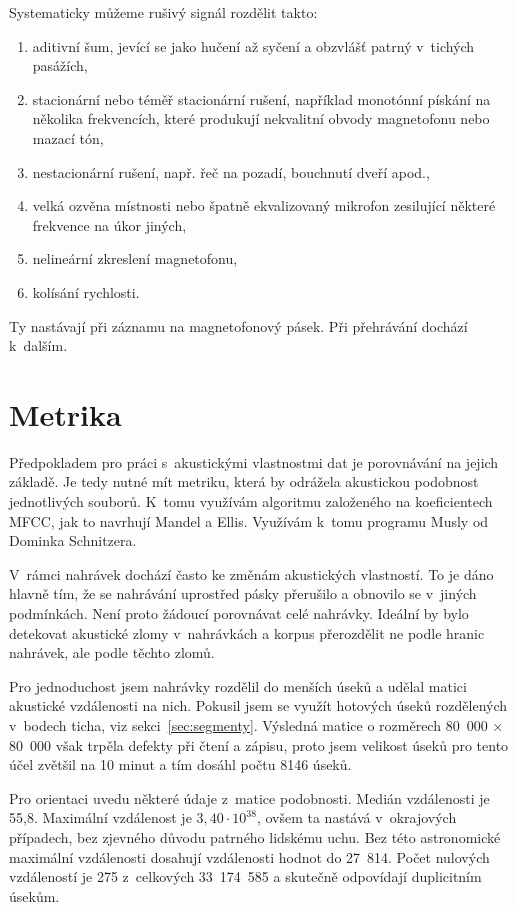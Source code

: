 Systematicky můžeme rušivý signál rozdělit takto:
\begin{enumerate}
\item{
    aditivní šum, jevící se jako hučení až syčení a obzvlášť patrný v~tichých
    pasážích,
}
\item{
    stacionární nebo téměř stacionární rušení, například monotónní pískání na
    několika frekvencích, které produkují nekvalitní obvody magnetofonu
    nebo mazací tón,
}
\item{
    nestacionární rušení, např. řeč na pozadí, bouchnutí dveří apod.,
}
\item{
    velká ozvěna místnosti nebo špatně ekvalizovaný mikrofon zesilující
    některé frekvence na úkor jiných,
}
\item{
    nelineární zkreslení magnetofonu,
}
\item{
    kolísání rychlosti.
}
\end{enumerate}
Ty nastávají při záznamu na magnetofonový pásek. Při přehrávání dochází
k~dalším.

\section{Metrika}
\label{sec:akustika:metrika}

Předpokladem pro práci s~akustickými vlastnostmi dat je porovnávání na jejich
základě. Je tedy nutné mít metriku, která by odrážela akustickou podobnost
jednotlivých souborů. K~tomu využívám algoritmu založeného na koeficientech
MFCC, jak to navrhují Mandel a Ellis\cite{mandel2005song}. Využívám
k~tomu programu Musly od Dominka Schnitzera\cite{schnitzer2011using}.

V~rámci nahrávek dochází často ke změnám akustických vlastností. To je dáno
hlavně tím, že se nahrávání uprostřed pásky přerušilo a obnovilo se v~jiných
podmínkách. Není proto žádoucí porovnávat celé nahrávky. Ideální by bylo
detekovat akustické zlomy v~nahrávkách a korpus přerozdělit ne podle hranic
nahrávek, ale podle těchto zlomů.

Pro jednoduchost jsem nahrávky rozdělil do menších úseků a udělal matici
akustické vzdálenosti na nich. Pokusil jsem se využít hotových úseků rozdělených
v~bodech ticha, viz sekci~\ref{sec:segmenty}. Výsledná matice o rozměrech
80~000 × 80~000 však trpěla defekty při čtení a zápisu, proto jsem velikost
úseků pro tento účel zvětšil na 10 minut a tím dosáhl počtu 8146 úseků.

Pro orientaci uvedu některé údaje z~matice podobnosti. 
Medián vzdálenosti je 55,8.
Maximální vzdálenost je $3,40\cdot{}10^{38}$, ovšem ta nastává v~okrajových
případech, bez zjevného důvodu patrného lidskému uchu. Bez této astronomické
maximální vzdálenosti dosahují vzdálenosti hodnot do 27~814.
Počet nulových vzdáleností je 275 z~celkových 33~174~585 a skutečně odpovídají
duplicitním úsekům.


